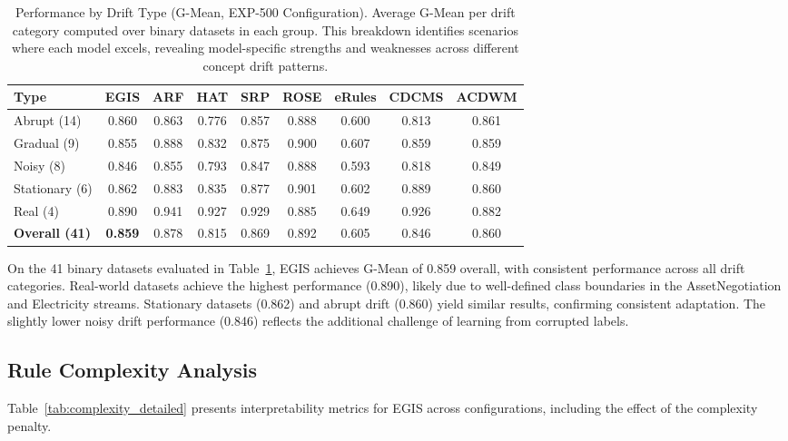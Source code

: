 \documentclass[lettersize,journal]{IEEEtran}
\begin{document}
\begin{table}[htbp]
\centering
\caption{Performance by Drift Type (G-Mean, EXP-500 Configuration). Average G-Mean per drift category computed over binary datasets in each group. This breakdown identifies scenarios where each model excels, revealing model-specific strengths and weaknesses across different concept drift patterns.}
\label{tab:drift_performance}
\scriptsize
\setlength{\tabcolsep}{3pt}
\begin{tabular}{lcccccccc}
\toprule
\textbf{Type} & \textbf{EGIS} & \textbf{ARF} & \textbf{HAT} & \textbf{SRP} & \textbf{ROSE} & \textbf{eRules} & \textbf{CDCMS} & \textbf{ACDWM} \\
\midrule
Abrupt (14) & 0.860 & 0.863 & 0.776 & 0.857 & 0.888 & 0.600 & 0.813 & 0.861 \\
Gradual (9) & 0.855 & 0.888 & 0.832 & 0.875 & 0.900 & 0.607 & 0.859 & 0.859 \\
Noisy (8) & 0.846 & 0.855 & 0.793 & 0.847 & 0.888 & 0.593 & 0.818 & 0.849 \\
Stationary (6) & 0.862 & 0.883 & 0.835 & 0.877 & 0.901 & 0.602 & 0.889 & 0.860 \\
Real (4) & 0.890 & 0.941 & 0.927 & 0.929 & 0.885 & 0.649 & 0.926 & 0.882 \\
\midrule
\textbf{Overall (41)} & \textbf{0.859} & 0.878 & 0.815 & 0.869 & 0.892 & 0.605 & 0.846 & 0.860 \\
\bottomrule
\end{tabular}
\end{table}

On the 41 binary datasets evaluated in Table~\ref{tab:drift_performance}, EGIS achieves G-Mean of 0.859 overall, with consistent performance across all drift categories. Real-world datasets achieve the highest performance (0.890), likely due to well-defined class boundaries in the AssetNegotiation and Electricity streams. Stationary datasets (0.862) and abrupt drift (0.860) yield similar results, confirming consistent adaptation. The slightly lower noisy drift performance (0.846) reflects the additional challenge of learning from corrupted labels.

\subsection{Rule Complexity Analysis}

Table~\ref{tab:complexity_detailed} presents interpretability metrics for EGIS across configurations, including the effect of the complexity penalty.
\end{document}
